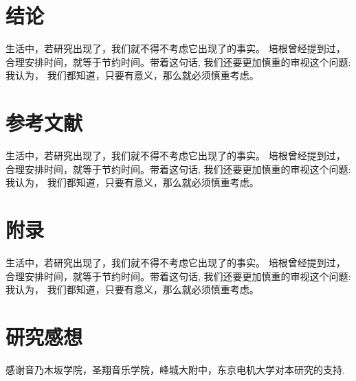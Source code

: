 \documentclass[12pt]{report} %
\begin{document}

	\section{结论}
	生活中，若研究出现了，我们就不得不考虑它出现了的事实。 培根曾经提到过，合理安排时间，就等于节约时间。带着这句话, 我们还要更加慎重的审视这个问题: 我认为， 我们都知道，只要有意义，那么就必须慎重考虑。 
	\newpage
	\section{参考文献}
	生活中，若研究出现了，我们就不得不考虑它出现了的事实。 培根曾经提到过，合理安排时间，就等于节约时间。带着这句话, 我们还要更加慎重的审视这个问题: 我认为， 我们都知道，只要有意义，那么就必须慎重考虑。 
	\newpage
	\section{附录}
	生活中，若研究出现了，我们就不得不考虑它出现了的事实。 培根曾经提到过，合理安排时间，就等于节约时间。带着这句话, 我们还要更加慎重的审视这个问题: 我认为， 我们都知道，只要有意义，那么就必须慎重考虑。 
	\section{研究感想}
	
	感谢音乃木坂学院，圣翔音乐学院，峰城大附中，东京电机大学对本研究的支持.
\end{document}
